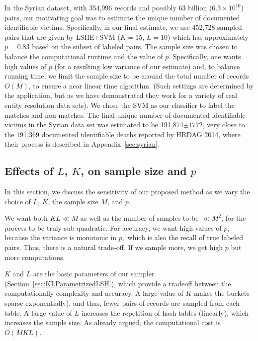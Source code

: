 \documentclass{imsart}
\begin{document}
In the Syrian dataset, with 354,996 records and possibly 63 billion ($6.3 \times 10^{10}$) pairs, our motivating goal was to estimate the unique number of documented identifiable victims. Specifically, in our final estimate, we use
452,728 sampled pairs that are given by  LSHE+SVM  ($K = 15$, $L = 10$) which has approximately $p=0.83$ based on the subset of labeled pairs. The sample size was chosen to balance the computational runtime and the value of $p$.
Specifically, one wants high values of $p$ (for a resulting low variance of our estimate) and, to balance running time, we
limit the sample size to be around the total number of records $O(M)$, to ensure a near linear time algorithm. (Such settings are determined by the application, but as we have demonstrated they work for a variety of real entity resolution data sets). We chose the SVM as our classifier to label the matches and non-matches. The final unique number of documented identifiable victims in the Syrian data set was estimated to be 191,874$ \pm 1772$, very close to the 191,369 documented identifiable deaths reported by HRDAG 2014, where their process is described in Appendix~\ref{sec:syrian}.

\subsection{Effects of $L$, $K$, on sample size and $p$}
\label{sec:parameterstudy}
In this section, we discuss the sensitivity of our proposed method as we vary the choice of $L$, $K$, the sample size $M$, and $p$.

We want both $KL \ll M$ as well as the number of samples to be $\ll M^2$, for the process to be truly sub-quadratic. For accuracy, we want high values of $p$, because the variance is monotonic in $p,$ which is also the recall of true labeled pairs. Thus, there is a natural trade-off. If we sample more, we get high $p$ but more computations.

$K$ and $L$ are the basic parameters of our sampler (Section~\ref{sec:KLParametrizedLSH}), which provide a tradeoff between the computationally complexity and accuracy. A large value of $K$ makes the buckets sparse exponentially), and thus, fewer pairs of records are sampled from each table. A large value of $L$ increases the repetition of hash tables (linearly), which increases the sample size. As already argued, the computational cost is $O(MKL)$.
\end{document}
